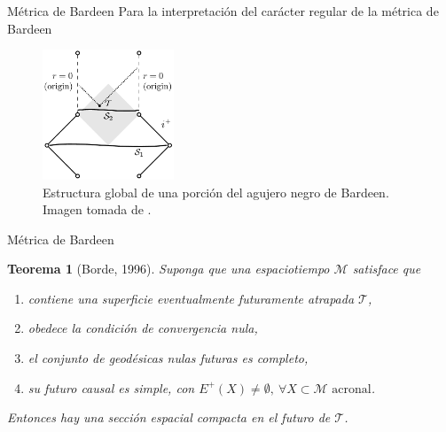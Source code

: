\documentclass[t]{beamer}
\numberwithin{equation}{section}
\newtheorem{teorem}{Teorema}
\begin{document}
\begin{frame}{Métrica de Bardeen}
Para la interpretación del carácter regular de la métrica de Bardeen

\begin{figure}[h!]
	\centering
	\includegraphics[width=0.35\textwidth]{bardeenDiagram}
	\caption{Estructura global de una porción del agujero negro de Bardeen. Imagen tomada de \cite{borde1994}.}
	\label{fig: bardeen diagram}
\end{figure}
\end{frame}

\begin{frame}{Métrica de Bardeen}
\vspace{\fill}
\begin{teorem}[Borde, 1996]
	\label{borde reg thm}
	Suponga que una espaciotiempo $\mathcal{M}$ satisface que
	
	\begin{enumerate}[i]
		\item contiene una superficie eventualmente futuramente atrapada $\mathcal{T}$,
		
		\item obedece la condición de convergencia nula,
		
		\item el conjunto de geodésicas nulas futuras es completo,
		
		\item su futuro causal es simple, con $E^{+}(X) \neq \emptyset,\ \forall X \subset \mathcal{M} \text{\ acronal}$.
	\end{enumerate}
	
	Entonces hay una sección espacial compacta en el futuro de $\mathcal{T}$.
\end{teorem}
\vspace{\fill}
\end{frame}
\end{document}
